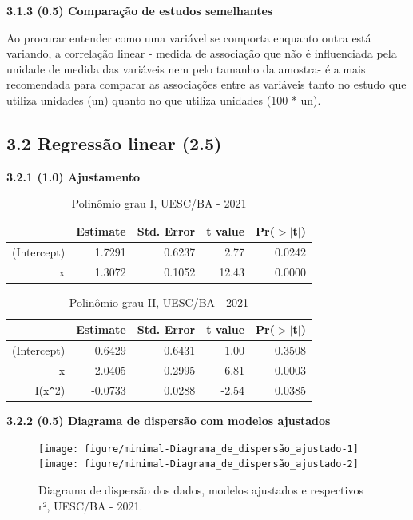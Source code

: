 \documentclass[12pt]{article}\usepackage[]{graphicx}\usepackage[]{color}
\newenvironment{knitrout}{}{} %
\begin{document}
  
  \textbf{3.1.3 (0.5) Comparação de estudos semelhantes}
  
   Ao procurar entender como uma variável se comporta enquanto outra está variando, a correlação linear - medida de associação que não é influenciada pela unidade de medida das variáveis nem pelo tamanho da amostra- é a mais recomendada para comparar as associações entre as variáveis tanto no estudo que utiliza unidades (un) quanto no que utiliza unidades (100 * un).

\subsection{3.2 Regressão linear (2.5)}

  \textbf{3.2.1 (1.0) Ajustamento}


\begin{table}[!ht]
\centering
\caption{Polinômio grau I, UESC/BA - 2021}
\begin{tabular}{rrrrr}
  \hline
 & Estimate & Std. Error & t value & Pr($>$$|$t$|$) \\ 
  \hline
(Intercept) & 1.7291 & 0.6237 & 2.77 & 0.0242 \\ 
  x & 1.3072 & 0.1052 & 12.43 & 0.0000 \\ 
   \hline
\end{tabular}
\end{table}

\begin{table}[!ht]
\centering
\caption{Polinômio grau II, UESC/BA - 2021}
\begin{tabular}{rrrrr}
  \hline
 & Estimate & Std. Error & t value & Pr($>$$|$t$|$) \\ 
  \hline
(Intercept) & 0.6429 & 0.6431 & 1.00 & 0.3508 \\ 
  x & 2.0405 & 0.2995 & 6.81 & 0.0003 \\ 
  I(x\verb|^|2) & -0.0733 & 0.0288 & -2.54 & 0.0385 \\ 
   \hline 
   \hline
\end{tabular}
\end{table}

\clearpage
  \textbf{3.2.2 (0.5) Diagrama de dispersão com modelos ajustados}
  
\begin{figure}[!h]
\label{figura:Diagrama de dispersão_ajustado}
\begin{knitrout}
\color{fgcolor}
{\centering \texttt{[image: figure/minimal-Diagrama\_de\_dispersão\_ajustado-1]} 
\texttt{[image: figure/minimal-Diagrama\_de\_dispersão\_ajustado-2]} 
}
\end{knitrout}
\caption{Diagrama de dispersão dos dados, modelos ajustados e respectivos r², UESC/BA - 2021.}
\end{figure} 
\end{document}
